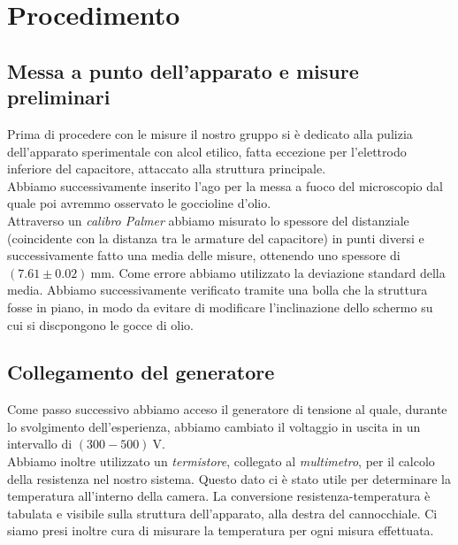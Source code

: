 \section{Procedimento}    
    \subsection{Messa a punto dell'apparato e misure preliminari}
        Prima di procedere con le misure il nostro gruppo si è dedicato alla pulizia dell'apparato sperimentale con alcol etilico, fatta eccezione per l'elettrodo inferiore del capacitore, attaccato alla struttura principale.\\
        Abbiamo successivamente inserito l'ago per la messa a fuoco del microscopio dal quale poi avremmo osservato le goccioline d'olio.\\
        Attraverso un \textit{calibro Palmer} abbiamo misurato lo spessore del distanziale (coincidente con la distanza tra le armature del capacitore) in punti diversi e successivamente fatto una media delle misure, ottenendo uno spessore di 
            $(7.61\pm0.02)~\mathrm{mm}$.
        Come errore abbiamo utilizzato la deviazione standard della media.
        Abbiamo successivamente verificato tramite una bolla che la struttura fosse in piano, in modo da evitare di modificare l'inclinazione dello schermo su cui si discpongono le gocce di olio.

        
    
    \subsection{Collegamento del generatore}
        Come passo successivo abbiamo acceso il generatore di tensione al quale, durante lo svolgimento dell'esperienza, abbiamo cambiato il voltaggio in uscita in un intervallo di
            $(300-500)~\mathrm{V}$.\\
        Abbiamo inoltre utilizzato un \textit{termistore}, collegato al \textit{multimetro}, per il calcolo della resistenza nel nostro sistema. Questo dato ci è stato utile per determinare la temperatura all'interno della camera. La conversione resistenza-temperatura è tabulata e visibile sulla struttura dell'apparato, alla destra del cannocchiale.
        Ci siamo presi inoltre cura di misurare la temperatura per ogni
        misura effettuata.
